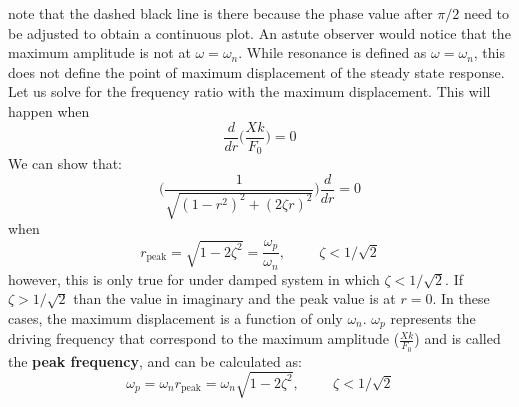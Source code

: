 \documentclass[12pt,letter]{article}
\numberwithin{ex}{section} %
\begin{document}
			note that the dashed black line is there because the phase value after $\pi/2$ need to be adjusted to obtain a continuous plot. An astute observer would notice that the maximum amplitude is not at $\omega = \omega_n$. While resonance is defined as $\omega = \omega_n$, this does not define the point of maximum displacement of the steady state response. Let us solve for the frequency ratio with the maximum displacement. This will happen when
			\begin{equation}
				\frac{d}{dr}\Bigg(\frac{Xk}{F_0} \Bigg)= 0
			\end{equation}				
			We can show that:
			\begin{equation}
			\Bigg(\frac{1}{\sqrt{(1-r^2)^2+(2\zeta r)^2}}\Bigg)	\frac{d}{dr} =0
			\end{equation}	
			when 
			\begin{equation}
			r_{\text{peak}} = \sqrt{1-2 \zeta^2}= \frac{\omega_p}{\omega_n}, \hspace{1cm} \zeta<1/\sqrt{2} 
			\end{equation}				
			however, this is only true for under damped system in which $\zeta<1/\sqrt{2}$. If $\zeta>1/\sqrt{2}$ than the value in imaginary and the peak value is at $r=0$. In these cases, the maximum displacement is a function of only $\omega_n$. $\omega_p$ represents the driving frequency that correspond to the maximum amplitude ($\frac{Xk}{F_0}$) and is called the \textbf{peak frequency}, and can be calculated as:
			\begin{equation}
			\omega_p = \omega_n r_{\text{peak}} = \omega_n \sqrt{1-2 \zeta^2}, \hspace{1cm} \zeta<1/\sqrt{2} 
			\end{equation}				
			
			
			
\end{document}
